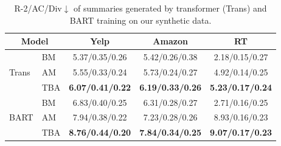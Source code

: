 \begin{table}[th]
	\centering
	\small
		\begin{tabular}{|l|l|ccc|}
			\hline
			\multicolumn{2}{|c|}{\bf Model} & \bf Yelp & \bf Amazon & \bf RT \\ 
			\hline
			\multirow{3}{*}{Trans} & BM & 5.37/0.35/0.26& 5.42/0.26/0.38& 2.18/0.15/0.27 \\
			& AM & 5.55/0.33/0.24 & 5.73/0.24/0.27& 4.92/0.14/0.25\\
			& TBA & \bf 6.07/0.41/0.22 & \bf 6.19/0.33/0.26 & \bf 5.23/0.17/0.24 \\
			\hline
			\multirow{3}{*}{BART} & BM & 6.83/0.40/0.25 & 6.31/0.28/0.27 & 2.71/0.16/0.25 \\
			& AM & 7.94/0.38/0.22 & 7.23/0.28/0.26 & 8.93/0.16/0.23\\
			& TBA & \bf 8.76/0.44/0.20 & \bf 7.84/0.34/0.25 & \bf 9.07/0.17/0.23 \\
			\hline
		\end{tabular}
	\caption{R-2/AC/Div$\downarrow$ of summaries generated by transformer (Trans) and BART training on our synthetic data.}	\label{tab:abla}
\end{table}

